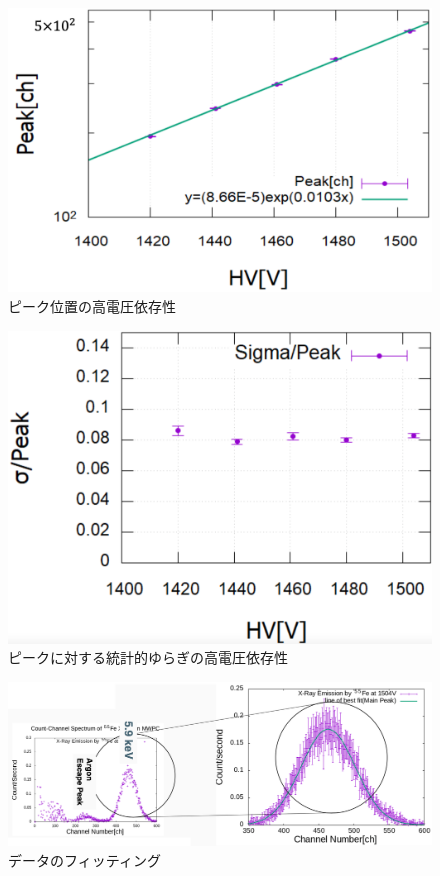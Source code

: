 \documentclass[a4j]{jsarticle}
\begin{document}
	\begin{figure}[htbp]
	\centering
	\includegraphics[width=12cm]{relation_ch+hivol.png}
	\caption{ピーク位置の高電圧依存性}
	\label{rex1}
	\end{figure}
	
	\begin{figure}[htbp]
	\centering
	\includegraphics[width=12cm]{relation_sigmach+hivol.png}
	\caption{ピークに対する統計的ゆらぎの高電圧依存性}
	\label{rex2}
	\end{figure}
	
	\begin{figure}[htbp]
	\centering
	\includegraphics[width=17cm]{xray_spectrumFe55.png}
	\caption{データのフィッティング}
	\label{x2}
	\end{figure}
	
\end{document}
